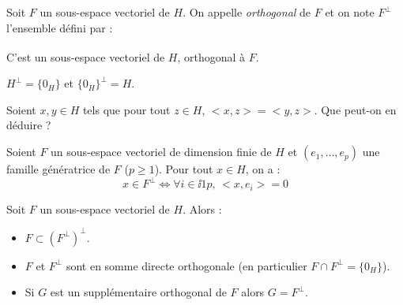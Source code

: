 \documentclass[french,11pt,twoside]{VcCours}
\begin{document}
\begin{TheoremeDefinition}{} Soit $F$ un sous-espace vectoriel de $H$. On appelle \emph{orthogonal} de $F$ et on note $F^{\perp}$ l'ensemble défini par :
$$ \phantom{F^{\perp} = \lbrace y \in H \, \vert \, \forall x \in F, \, <x,y>=0 \rbrace}$$
C'est un sous-espace vectoriel de $H$, orthogonal à $F$.
\end{TheoremeDefinition}

\begin{Demonstration}{}

\vspace{6cm}
\end{Demonstration}

\begin{Proposition}{} $H^{\perp} = \lbrace 0_H \rbrace$ et $\lbrace 0_H \rbrace^{\perp} = H$.
\end{Proposition}

\begin{Demonstration}{}
\vspace{2cm}
\end{Demonstration}

\begin{ApplicationDirecte}{} Soient $x,y \in H$ tels que pour tout $z \in H$, $<x,z>=<y,z>$. Que peut-on en déduire ?
\end{ApplicationDirecte}

\begin{Proposition}{} Soient $F$ un sous-espace vectoriel de dimension finie de $H$ et $(e_1, \ldots, e_p)$ une famille génératrice de $F$ ($p \geq 1$). Pour tout $x \in H$, on a :
$$ x \in F^{\perp} \Longleftrightarrow \forall i \in \ii{1}{p}, \, <x,e_i> =0 $$
\end{Proposition}

\begin{Demonstration}{}
\vspace{6cm}

\end{Demonstration}

\begin{Proposition}{} Soit $F$ un sous-espace vectoriel de $H$. Alors :
\begin{itemize}
\item $F \subset (F^{\perp})^{\perp}$.
\item $F$ et $F^{\perp}$ sont en somme directe orthogonale (en particulier $F \cap F^{\perp} = \lbrace 0_H \rbrace$).
\item Si $G$ est un supplémentaire orthogonal de $F$ alors $G= F^{\perp}$.
\end{itemize}
\end{Proposition}
\end{document}
